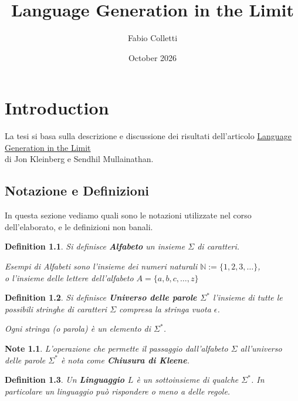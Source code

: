 \documentclass{report}
\title{Language Generation in the Limit}
\author{Fabio Colletti}
\date{October 2026}
\newtheorem{defi}{Definition}
\newtheorem{note}{Note}
\newenvironment{pop}{}{}
\begin{document}
\maketitle

\chapter{Introduction}
La tesi si basa sulla descrizione e discussione dei risultati dell'articolo \href{https://arxiv.org/pdf/2404.06757}{Language Generation in the Limit} \\
di Jon Kleinberg e Sendhil Mullainathan.

\section{Notazione e Definizioni}

\begin{pop}
  In questa sezione vediamo quali sono le notazioni utilizzate nel corso dell'elaborato, e le definizioni non banali.
\end{pop}

\begin{defi}
  Si definisce \textbf{Alfabeto} un insieme \textbf{$\Sigma$} di caratteri.

  Esempi di Alfabeti sono l'insieme dei numeri naturali $\mathds{N} := \{1,2,3,\dots \} $, \\ 
  o l'insieme delle lettere dell'alfabeto $A=\{a,b,c,\dots,z\}$
\end{defi}

\begin{defi}
  Si definisce \textbf{Universo delle parole $\Sigma^*$} l'insieme di tutte le possibili
  stringhe di caratteri $\Sigma$ compresa la stringa vuota $\epsilon$.

  Ogni stringa (o parola) è un elemento di \textbf{$\Sigma^*$}.
\end{defi} 

\begin{note}
  L'operazione che permette il passaggio dall'alfabeto $\Sigma$ all'universo delle parole $\Sigma^*$ 
è nota come \textbf{Chiusura di Kleene}.
\end{note}

\begin{defi}
  Un \textbf{Linguaggio $L$} è un sottoinsieme di qualche $\Sigma^*$.  
  In particolare un linguaggio può rispondere o meno a delle regole.
\end{defi}
\end{document}
